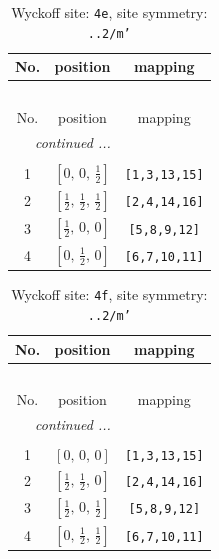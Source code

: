 \documentclass[fleqn,8pt]{jsarticle}
\begin{document}
\renewcommand{\arraystretch}{1.2}
\begin{longtable}{ccc}
\caption{Wyckoff site: {\tt 4e}, site symmetry: {\tt ..2/m'}}
 \\
 \hline \hline
No. & position & mapping \\ \hline \endfirsthead

\multicolumn{2}{l}{\tablename\ \thetable{}} \\
 \hline \hline
No. & position & mapping \\ \hline \endhead

 \hline \hline
\multicolumn{2}{r}{\footnotesize\it continued ...} \\ \endfoot

 \hline \hline
\multicolumn{2}{r}{} \\ \endlastfoot

1 & $\left[ 0,\, 0,\, \frac{1}{2} \right]$ & {\tt [1,3,13,15]} \\ \hline
2 & $\left[ \frac{1}{2},\, \frac{1}{2},\, \frac{1}{2} \right]$ & {\tt [2,4,14,16]} \\ \hline
3 & $\left[ \frac{1}{2},\, 0,\, 0 \right]$ & {\tt [5,8,9,12]} \\ \hline
4 & $\left[ 0,\, \frac{1}{2},\, 0 \right]$ & {\tt [6,7,10,11]} \\
\end{longtable}
\renewcommand{\arraystretch}{1.2}
\begin{longtable}{ccc}
\caption{Wyckoff site: {\tt 4f}, site symmetry: {\tt ..2/m'}}
 \\
 \hline \hline
No. & position & mapping \\ \hline \endfirsthead

\multicolumn{2}{l}{\tablename\ \thetable{}} \\
 \hline \hline
No. & position & mapping \\ \hline \endhead

 \hline \hline
\multicolumn{2}{r}{\footnotesize\it continued ...} \\ \endfoot

 \hline \hline
\multicolumn{2}{r}{} \\ \endlastfoot

1 & $\left[ 0,\, 0,\, 0 \right]$ & {\tt [1,3,13,15]} \\ \hline
2 & $\left[ \frac{1}{2},\, \frac{1}{2},\, 0 \right]$ & {\tt [2,4,14,16]} \\ \hline
3 & $\left[ \frac{1}{2},\, 0,\, \frac{1}{2} \right]$ & {\tt [5,8,9,12]} \\ \hline
4 & $\left[ 0,\, \frac{1}{2},\, \frac{1}{2} \right]$ & {\tt [6,7,10,11]} \\
\end{longtable}
\end{document}

